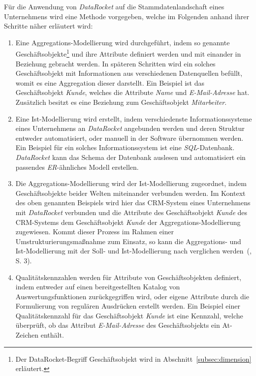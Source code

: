 \documentclass[
  language=german, %
  type=bachelor,%
  ngerman
]{isthesis}
\begin{document}
\begin{content}
	Für die Anwendung von \textit{DataRocket} auf die Stammdatenlandschaft eines
	Unternehmens wird eine Methode vorgegeben, welche im Folgenden anhand ihrer
	Schritte näher erläutert wird:

	\begin{enumerate}
		\item Eine Aggregations-Modellierung wird durchgeführt, indem so genannte
		Geschäftsobjekte\footnote{Der DataRocket-Begriff Geschäftsobjekt wird in
		Abschnitt~\ref{subsec:dimension} erläutert.} und ihre Attribute definiert
		werden und mit einander in Beziehung gebracht werden. In späteren Schritten
		wird ein solches Geschäftsobjekt mit Informationen aus verschiedenen
		Datenquellen befüllt, womit es eine Aggregation dieser darstellt. Ein
		Beispiel ist das Geschäftsobjekt \textit{Kunde}, welches die Attribute
		\textit{Name} und \textit{E-Mail-Adresse} hat. Zusätzlich besitzt es eine
		Beziehung zum Geschäftsobjekt \textit{Mitarbeiter}. 

    \item Eine Ist-Modellierung wird erstellt, indem verschiedenste
      Informationssysteme eines Unternehmens an \textit{DataRocket} angebunden
      werden und deren Struktur entweder automatisiert, oder manuell in der
			Software übernommen werden. Ein Beispiel für ein solches
			Informationssystem ist eine \textit{SQL}-Datenbank. \textit{DataRocket}
			kann das Schema der Datenbank auslesen und automatisiert ein passendes
			\textit{\acrshort{ER}}-ähnliches Modell erstellen.

		\item Die Aggregations-Modellierung wird der Ist-Modellierung zugeordnet,
		indem Geschäftsobjekte beider Welten miteinander verbunden werden. Im
		Kontext des oben genannten Beispiels wird hier das \acrshort{CRM}-System
		eines Unternehmens mit \textit{DataRocket} verbunden und die Attribute des
		Geschäftsobjekt \textit{Kunde} des \acrshort{CRM}-Systems dem
		Geschäftsobjekt \textit{Kunde} der Aggregations-Modellierung zugewiesen.
		Kommt dieser Prozess \zB{} im Rahmen einer Umstrukturierungsmaßnahme
		zum Einsatz, so kann die Aggregations- und Ist-Modellierung mit der Soll-
		und Ist-Modellierung nach \textsc{\citeauthor{becker2006konzeptionelle}}
		verglichen werden~(\citeyear{becker2006konzeptionelle}, S. 3).

		\item Qualitätskennzahlen werden für Attribute von Geschäftsobjekten
		definiert, indem entweder auf einen bereitgestellten Katalog von
		Auswertungsfunktionen zurückgegriffen wird, oder eigene Attribute durch die
		Formulierung von regulären Ausdrücken erstellt werden. Ein Beispiel einer
		Qualitätskennzahl für das Geschäftsobjekt \textit{Kunde} ist eine Kennzahl,
		welche überprüft, ob das Attribut \textit{E-Mail-Adresse} des
		Geschäftsobjekts ein At-Zeichen enthält.


\end{enumerate}
\end{content}
\end{document}
